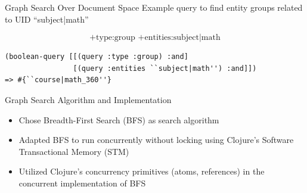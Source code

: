 \documentclass[compress]{beamer}
\begin{document}
		\begin{frame}[fragile]{Graph Search Over Document Space}
			Example query to find entity groups related to UID ``subject|math''
			
			\[
				\text{+type:group +entities:subject|math}
			\]
			
			\begin{verbatim}
(boolean-query [[(query :type :group) :and]
                [(query :entities ``subject|math'') :and]])
=> #{``course|math_360''}
			\end{verbatim}
		\end{frame}
		
		\begin{frame}{Graph Search Algorithm and Implementation}
			\begin{itemize}
				\item Chose \alert{Breadth-First Search (BFS)} as search algorithm
				\item Adapted BFS to run concurrently without locking using Clojure's \alert{Software Transactional Memory (STM)}
				\item Utilized Clojure's concurrency primitives (atoms, references) in the concurrent implementation of BFS
			\end{itemize}
		\end{frame}
	
\end{document}
